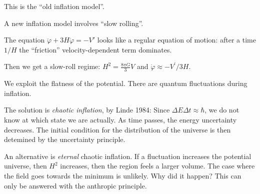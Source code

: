 \documentclass[main.tex]{subfiles}
\begin{document}
This is the ``old inflation model''.

A new inflation model involves ``slow rolling''.

The equation \(\ddot{\varphi } + 3 H \dot{\varphi } = - V'\) looks like a regular equation of motion: after a time \(1/H\) the ``friction'' velocity-dependent term dominates.

Then we get a slow-roll regime: \(H^2  = \frac{8 \pi G}{3} V \) and \(\dot{\varphi} \approx - V^{\prime }/3H\).

We exploit the flatness of the potential.
There are quantum fluctuations during inflation.

The solution is \emph{chaotic inflation}, by Linde 1984:
Since \(\Delta E \Delta t \approx \hbar\), we do not know at which state we are actually. 
As time passes, the energy uncertainty decreases.
The initial condition for the distribution of the universe is then detemined by the uncertainty principle.

An alternative is \emph{eternal} chaotic inflation.
If a fluctuation increases the potential universe, then \(H^2\) increases, then the region feels a larger volume. The case where the field goes towards the minimum is unlikely.
Why did it happen? This can only be answered with the anthropic principle.
\end{document}
